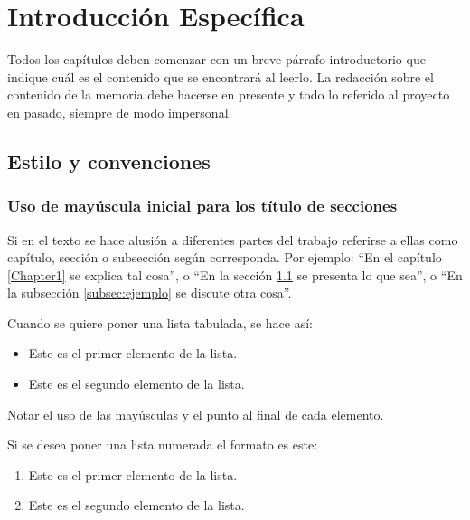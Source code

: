 \chapter{Introducción Específica} %

\label{Chapter2}

Todos los capítulos deben comenzar con un breve párrafo introductorio que indique cuál es el contenido que se encontrará al leerlo.  La redacción sobre el contenido de la memoria debe hacerse en presente y todo lo referido al proyecto en pasado, siempre de modo impersonal.

\section{Estilo y convenciones}
\label{sec:ejemplo}

\subsection{Uso de mayúscula inicial para los título de secciones}

Si en el texto se hace alusión a diferentes partes del trabajo referirse a ellas como capítulo, sección o subsección según corresponda. Por ejemplo: ``En el capítulo \ref{Chapter1} se explica tal cosa'', o ``En la sección \ref{sec:ejemplo} se presenta lo que sea'', o ``En la subsección \ref{subsec:ejemplo} se discute otra cosa''.

Cuando se quiere poner una lista tabulada, se hace así:

\begin{itemize}
	\item Este es el primer elemento de la lista.
	\item Este es el segundo elemento de la lista.
\end{itemize}

Notar el uso de las mayúsculas y el punto al final de cada elemento.

Si se desea poner una lista numerada el formato es este:

\begin{enumerate}
	\item Este es el primer elemento de la lista.
	\item Este es el segundo elemento de la lista.
\end{enumerate}


